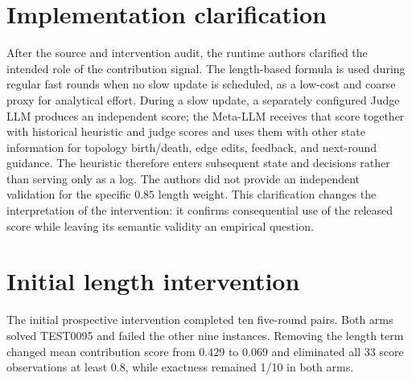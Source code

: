 \section{Implementation clarification}

After the source and intervention audit, the runtime authors clarified the intended role of the contribution signal. The length-based formula is used during regular fast rounds when no slow update is scheduled, as a low-cost and coarse proxy for analytical effort. During a slow update, a separately configured Judge LLM produces an independent score; the Meta-LLM receives that score together with historical heuristic and judge scores and uses them with other state information for topology birth/death, edge edits, feedback, and next-round guidance. The heuristic therefore enters subsequent state and decisions rather than serving only as a log. The authors did not provide an independent validation for the specific $0.85$ length weight. This clarification changes the interpretation of the intervention: it confirms consequential use of the released score while leaving its semantic validity an empirical question.

\section{Initial length intervention}
\label{app:initiallength}

The initial prospective intervention completed ten five-round pairs. Both arms solved TEST0095 and failed the other nine instances. Removing the length term changed mean contribution score from 0.429 to 0.069 and eliminated all 33 score observations at least 0.8, while exactness remained 1/10 in both arms.

\begin{center}
\end{center}

